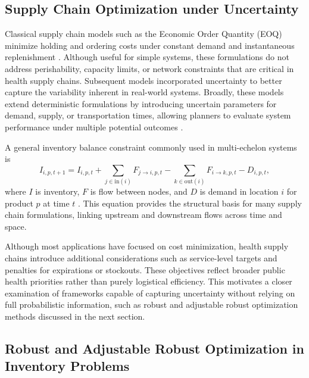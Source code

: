 \documentclass{article}
\begin{document}
\subsection{Supply Chain Optimization under Uncertainty}

Classical supply chain models such as the Economic Order Quantity (EOQ) minimize holding and ordering costs under constant demand and instantaneous replenishment \cite{harris13}. Although useful for simple systems, these formulations do not address perishability, capacity limits, or network constraints that are critical in health supply chains. Subsequent models incorporated uncertainty to better capture the variability inherent in real-world systems. Broadly, these models extend deterministic formulations by introducing uncertain parameters for demand, supply, or transportation times, allowing planners to evaluate system performance under multiple potential outcomes \cite{yu97}.

A general inventory balance constraint commonly used in multi-echelon systems is
\begin{equation}
I_{i,p,t+1} = I_{i,p,t} + \sum_{j \in \text{in}(i)} F_{j \to i, p, t} - \sum_{k \in \text{out}(i)} F_{i \to k, p, t} - D_{i,p,t},
\label{eq:perea}
\end{equation}
where $I$ is inventory, $F$ is flow between nodes, and $D$ is demand in location $i$ for product $p$ at time $t$ \cite{perea3}. This equation provides the structural basis for many supply chain formulations, linking upstream and downstream flows across time and space.

Although most applications have focused on cost minimization, health supply chains introduce additional considerations such as service-level targets and penalties for expirations or stockouts. These objectives reflect broader public health priorities rather than purely logistical efficiency. This motivates a closer examination of frameworks capable of capturing uncertainty without relying on full probabilistic information, such as robust and adjustable robust optimization methods discussed in the next section.

\subsection{Robust and Adjustable Robust Optimization in Inventory Problems}
\end{document}
